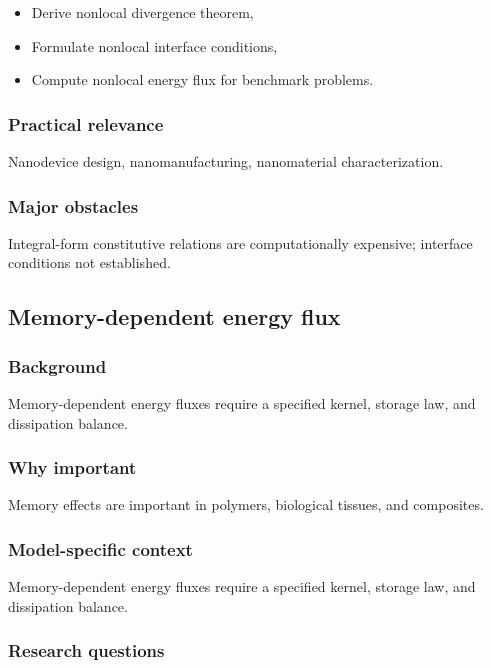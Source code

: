 \begin{itemize}
\item Derive nonlocal divergence theorem,
\item Formulate nonlocal interface conditions,
\item Compute nonlocal energy flux for benchmark problems.
\end{itemize}

\subsubsection{Practical relevance}

Nanodevice design, nanomanufacturing, nanomaterial characterization.

\subsubsection{Major obstacles}

Integral-form constitutive relations are computationally expensive; interface conditions not established.

\subsection{Memory-dependent energy flux}
\label{sec:15.7}

\subsubsection{Background}

Memory-dependent energy fluxes require a specified kernel, storage law, and dissipation balance.

\subsubsection{Why important}

Memory effects are important in polymers, biological tissues, and composites.

\subsubsection{Model-specific context}

Memory-dependent energy fluxes require a specified kernel, storage law, and dissipation balance.

\subsubsection{Research questions}

